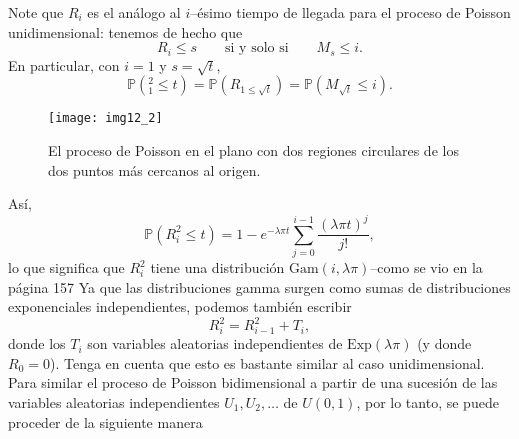 	Note que $R_{i}$ es el análogo al $i$--ésimo tiempo de llegada para el proceso de Poisson unidimensional: tenemos de hecho que
	\[
		R_{i}\le s\qquad\text{si y solo si}\qquad M_{s}\le i.
	\]
	En particular, con $i=1$ y $s=\sqrt{t}$,
	\[
		\mathds{P}\left(_{1}^{2}\le t\right)=\mathds{P}\left(R_{1\le\sqrt{t}}\right)=\mathds{P}\left(M_{\sqrt{t}}\le i\right).
	\]

	\begin{figure}[!ht]
		\centering
		\texttt{[image: img12\_2]}
		\caption{El proceso de Poisson en el plano con dos regiones circulares de los dos puntos más cercanos al origen.}
		\label{fig:12.2}
	\end{figure}

	Así,
	\[
		\mathds{P}\left(R_{i}^{2}\le t\right)=1-e^{-\lambda\pi t}\sum_{j=0}^{i-1}\frac{{\left(\lambda\pi t\right)}^{j}}{j!},
	\]
	lo que significa que $R_{i}^{2}$ tiene una distribución $\mathrm{Gam}\left(i,\lambda\pi\right)$--como se vio en la página 157 %
	Ya que las distribuciones gamma surgen como sumas de distribuciones exponenciales independientes, podemos también escribir
	\[
		R_{i}^{2}=R_{i-1}^{2}+T_{i},
	\]
	donde los $T_{i}$ son variables aleatorias independientes de $\mathrm{Exp}\left(\lambda\pi\right)$ (y donde $R_{0}=0$). Tenga en cuenta que esto es bastante similar al caso unidimensional. Para similar el proceso de Poisson bidimensional a partir de una sucesión de las variables aleatorias independientes $U_{1},U_{2},\ldots$ de $U\left(0,1\right)$, por lo tanto, se puede proceder de la siguiente manera